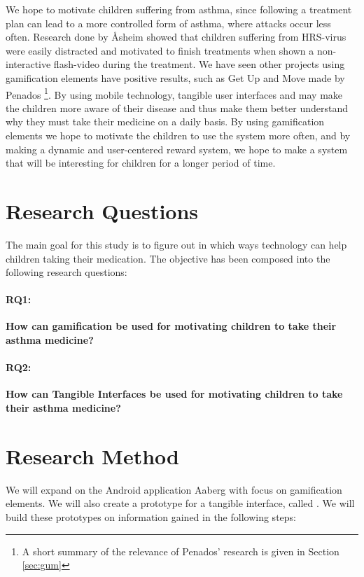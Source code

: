 We hope to motivate children suffering from asthma, since following a treatment plan can lead to a more controlled form of asthma, where attacks occur less often\cite{ginasthma}. 
Research done by \r{A}sheim showed that children suffering from HRS-virus were easily distracted and motivated to finish treatments when shown a non-interactive flash-video during the treatment\cite{Asheim610877}. We have seen other projects using gamification elements have positive results, such as Get Up and Move made by Penados \etal{}\cite{penadosget}\footnote{A short summary of the relevance of Penados' research is given in Section \ref{sec:gum}}. 
By using mobile technology, tangible user interfaces and may make the children more aware of their disease and thus make them better understand why they must take their medicine on a daily basis. 
By using gamification elements we hope to motivate the children to use the system more often, and by making a dynamic and user-centered reward system, we hope to make a system that will be interesting for children for a longer period of time.  


\section{Research Questions}
\label{sec:researchquestions}
The main goal for this study is to figure out in which ways technology can help children taking their medication. The objective has been composed into the following research questions: 

\paragraph{RQ1:}
\textbf{How can gamification be used for motivating children to take their asthma medicine?}


\paragraph{RQ2:}
\textbf{How can Tangible Interfaces be used for motivating children to take their asthma medicine?}


\section{Research Method}
\label{sec:researchmethod}
We will expand on the Android application Aaberg \etal{} with focus on gamification elements. We will also create a prototype for a tangible interface, called \buddy{}. We will build these prototypes on information gained in the following steps:


